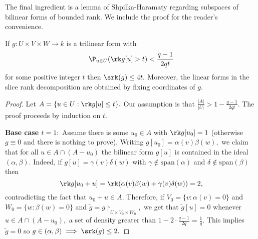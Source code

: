 The final ingredient is a lemma of Shpilka-Haramaty \cite{HS} regarding subspaces of bilinear forms of bounded rank. We include the proof for the reader's convenience.

\begin{lemma}\label{low-rk-der}
    If $g:U\times V\times W\to k$ is a trilinear form with
    $$\P_{u\in U} (\rk g[u] > t) < \frac{q-1}{2qt}$$ for some positive integer $t$ then $\srk (g) \le 4t.$ Moreover, the linear forms in the slice rank decomposition are obtained by fixing coordinates of $g.$
    \end{lemma}

    \begin{proof}
         Let $A = \{u\in U: \rk g[u] \le t \}.$ Our assumption is that $\frac{|A|}{|U|} > 1-\frac{q-1}{2qt}.$ The proof proceeds by induction on $t.$
         
         \textbf{Base case $t=1:$} Assume there is some $u_0\in A$ with $\rk g[u_0] = 1$ (otherwise $g\equiv 0$ and there is nothing to prove). Writing $g[u_0] = \alpha(v)\beta(w),$ we claim that for all $u\in A\cap (A-u_0)$ the bilinear form $g[u]$ is contained in the ideal $(\alpha,\beta).$  Indeed, if $g[u] = \gamma(v)\delta(w)$ with $\gamma \not\in \text{span}(\alpha)$ and $\delta\not\in\text{span}(\beta)$ then 
         \[
         \rk g[u_0+u] = \rk(\alpha(v)\beta(w)+\gamma(v)\delta(w)) = 2,
         \]
         contradicting the fact that $u_0+u \in A.$ Therefore, if $V_0 = \{v: \alpha(v) = 0\}$ and $W_0 = \{w: \beta(w) = 0\}$ and $\tilde g = g\restriction_{U\times V_0\times W_0},$ we get that $\tilde g[u] = 0$ whenever $u\in A\cap (A-u_0),$  a set of density greater than $ 1- 2\cdot \frac{q-1}{2q} = \frac{1}{q}.$ This implies $\tilde g = 0$ so $g\in(\alpha,\beta)\implies \srk(g) \le 2.$ 


\end{proof}
